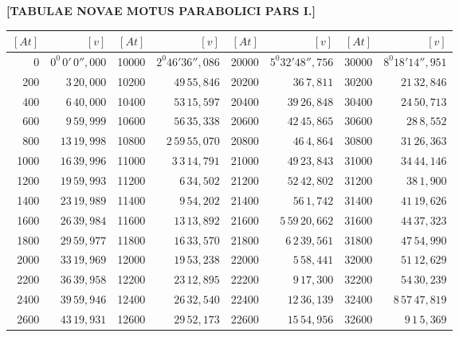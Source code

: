 \clearpage
{}
\begingroup
\centering
\fontsize{9}{9}\selectfont
\setlength{\tabcolsep}{3pt}
\renewcommand{\arraystretch}{.9}
\setlength{\parskip}{0pt}
\textbf{[TABULAE NOVAE MOTUS PARABOLICI PARS I.]}
\par\vspace{7pt}
\begin{tabular}{|r|r||r|r||r|r||r|r|}
\hline
\([At]\) & \([v]\) & \([At]\) & \([v]\) & \([At]\) & \([v]\) & \([At]\) & \([v]\) \\
\hline
0 & \(0^{0}\,0'\,0'',000\) & 10000 & \(2^{0}46'36'',086\) & 20000 & \(5^{0}32'48'',756\) & 30000 & \(8^{0}18'14'',951\) \\[1pt]
200 & \(3\,20,000\) & 10200 & \(49\,55,846\) & 20200 & \(36\,7,811\) & 30200 & \(21\,32,846\) \\
400 & \(6\,40,000\) & 10400 & \(53\,15,597\) & 20400 & \(39\,26,848\) & 30400 & \(24\,50,713\) \\
600 & \(9\,59,999\) & 10600 & \(56\,35,338\) & 20600 & \(42\,45,865\) & 30600 & \(28\,8,552\) \\
800 & \(13\,19,998\) & 10800 & \(2\,59\,55,070\) & 20800 & \(46\,4,864\) & 30800 & \(31\,26,363\) \\[1pt]
1000 & \(16\,39,996\) & 11000 & \(3\,3\,14,791\) & 21000 & \(49\,23,843\) & 31000 & \(34\,44,146\) \\[1pt]
1200 & \(19\,59,993\) & 11200 & \(6\,34,502\) & 21200 & \(52\,42,802\) & 31200 & \(38\,1,900\) \\
1400 & \(23\,19,989\) & 11400 & \(9\,54,202\) & 21400 & \(56\,1,742\) & 31400 & \(41\,19,626\) \\
1600 & \(26\,39,984\) & 11600 & \(13\,13,892\) & 21600 & \(5\,59\,20,662\) & 31600 & \(44\,37,323\) \\
1800 & \(29\,59,977\) & 11800 & \(16\,33,570\) & 21800 & \(6\,2\,39,561\) & 31800 & \(47\,54,990\) \\[1pt]
2000 & \(33\,19,969\) & 12000 & \(19\,53,238\) & 22000 & \(5\,58,441\) & 32000 & \(51\,12,629\) \\[1pt]
2200 & \(36\,39,958\) & 12200 & \(23\,12,895\) & 22200 & \(9\,17,300\) & 32200 & \(54\,30,239\) \\
2400 & \(39\,59,946\) & 12400 & \(26\,32,540\) & 22400 & \(12\,36,139\) & 32400 & \(8\,57\,47,819\) \\
2600 & \(43\,19,931\) & 12600 & \(29\,52,173\) & 22600 & \(15\,54,956\) & 32600 & \(9\,1\,5,369\) \\

\end{tabular}
